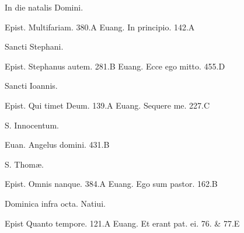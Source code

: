 \documentclass[a5paper,10pt]{book}
\def\ae{æ}
\begin{document}
\begin{multicols}{2}
\begin{center}
\color{red} In die natalis Domini.
\end{center}
\vspace{-.75em}
\par \noindent Epist. Multifariam. \hfill 380.A
\newline Euang. In principio. \hfill 142.A
\newline \vspace{-1.75em}
\begin{center}
\color{red} Sancti Stephani.
\end{center}
\vspace{-.75em}
\par \noindent Epist. Stephanus autem. \hfill 281.B
\newline Euang. Ecce ego mitto. \hfill 455.D
\newline \vspace{-1.75em}
\begin{center}
\color{red} Sancti Ioannis.
\end{center}
\vspace{-.75em}
\par \noindent Epist. Qui timet Deum. \hfill 139.A
\newline Euang. Sequere me. \hfill 227.C
\newline \vspace{-1.75em}
\begin{center}
\color{red} S. Innocentum.
\end{center}
\vspace{-.75em}
\par \noindent Euan. Angelus domini. \hfill 431.B
\newline \vspace{-1.75em}
\begin{center}
\color{red} S. Thom\ae .
\end{center}
\vspace{-.75em}
\par \noindent Epist. Omnis nanque. \hfill 384.A
\newline Euang. Ego sum pastor. \hfill 162.B
\newline \vspace{-1.75em}
\begin{center}
\color{red} Dominica infra octa. Natiui.
\end{center}
\vspace{-.75em}
\par \noindent Epist Quanto tempore. \hfill 121.A
\newline Euang. Et erant pat. ei. \hfill 76. \& 77.E%

\end{multicols}
\end{document}
